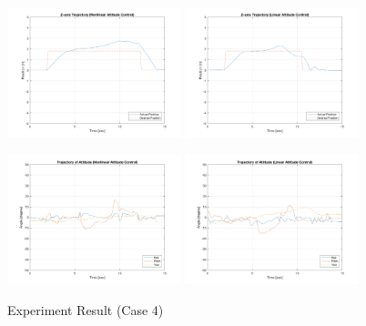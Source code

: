 \begin{figure}
    \includegraphics[width=0.45\textwidth]{graphics/experiment_plots/pitch_plus_non_position_z.png}
    \includegraphics[width=0.45\textwidth]{graphics/experiment_plots/pitch_plus_pid_position_z.png}

    \includegraphics[width=0.45\textwidth]{graphics/experiment_plots/pitch_plus_non_attitude.png}
    \includegraphics[width=0.45\textwidth]{graphics/experiment_plots/pitch_plus_pid_attitude.png}
    \caption{Experiment Result (Case 4)}
    \label{fig:exp_pitch_plus}
\end{figure}

